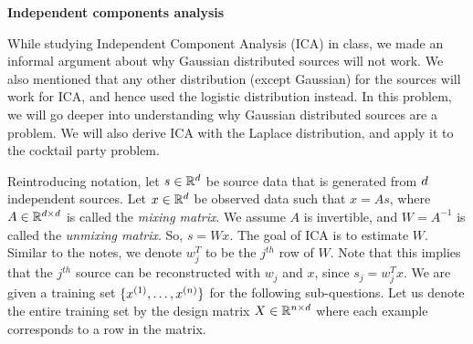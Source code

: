 \item {\bf Independent components analysis}

While studying Independent Component Analysis (ICA) in class, we made an informal argument about why Gaussian distributed sources will not work. We also mentioned that any other distribution (except Gaussian) for the sources will work for ICA, and hence used the logistic distribution instead. In this problem, we will go deeper into understanding why Gaussian distributed sources are a problem. We will also derive ICA with the Laplace distribution, and apply it to the cocktail party problem.

Reintroducing notation, let $s \in \mathbb{R}^{d}$ be source data that is generated from ${d}$ independent sources. Let $x \in \mathbb{R}^{d}$ be observed data such that $x = As$, where $A\in\mathbb{R}^{{d} \times {d}}$ is called the \emph{mixing matrix}. We assume $A$ is invertible, and $W = A^{-1}$ is called the \emph{unmixing matrix}. So, $s = Wx$. The goal of ICA is to estimate $W$. Similar to the notes, we denote $w_j^T$ to be the $j^{th}$ row of $W$. Note that this implies that the $j^{th}$ source can be reconstructed with $w_j$ and $x$, since $s_j = w_j^T x$. We are given a training set $\{x^{(1)},\ldots,x^{({n})}\}$ for the following sub-questions. Let us denote the entire training set by the design matrix $X \in \mathbb{R}^{{n} \times {d}}$ where each example corresponds to a row in the matrix.

\begin{enumerate}
    

    

    

\end{enumerate}
